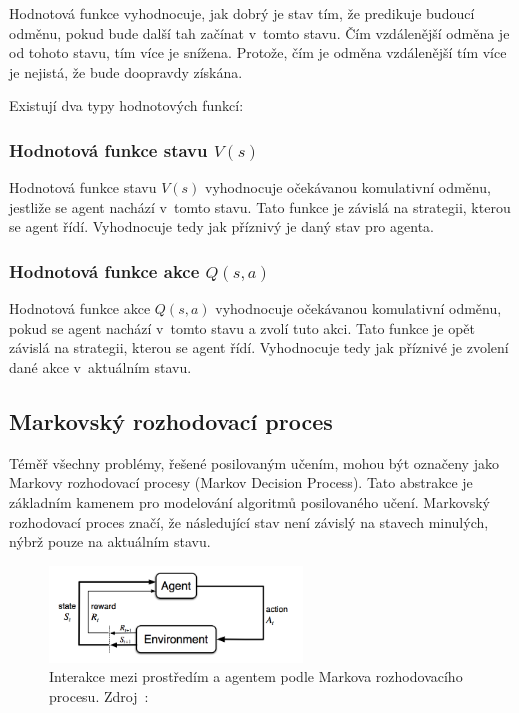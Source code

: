   Hodnotová funkce vyhodnocuje, jak dobrý je stav tím, že predikuje budoucí odměnu, pokud bude další tah začínat v~tomto stavu.
  Čím vzdálenější odměna je od tohoto stavu, tím více je snížena.
  Protože, čím je odměna vzdálenější tím více je nejistá, že bude doopravdy získána.

  Existují dva typy hodnotových funkcí:

  \subsubsection*{Hodnotová funkce stavu $V(s)$}

  Hodnotová funkce stavu \emph{$V(s)$} vyhodnocuje očekávanou komulativní odměnu, jestliže se agent nachází v~tomto stavu.
  Tato funkce je závislá na strategii, kterou se agent řídí.
  Vyhodnocuje tedy jak příznivý je daný stav pro agenta.

  \subsubsection*{Hodnotová funkce akce $Q(s, a)$}
  \label{subsubsec:q_function}

  Hodnotová funkce akce \emph{$Q(s, a)$} vyhodnocuje očekávanou komulativní odměnu, pokud se agent nachází v~tomto stavu a zvolí tuto akci.
  Tato funkce je opět závislá na strategii, kterou se agent řídí.
  Vyhodnocuje tedy jak příznivé je zvolení dané akce v~aktuálním stavu.

\subsection{Markovský rozhodovací proces}\label{subsec:markovsky-rozhodovaci-proces}

Téměř všechny problémy, řešené posilovaným učením, mohou být označeny jako Markovy rozhodovací procesy (Markov Decision Process).
Tato abstrakce je základním kamenem pro modelování algoritmů posilovaného učení.
Markovský rozhodovací proces značí, že následující stav není závislý na stavech minulých, nýbrž pouze na aktuálním stavu.

\begin{figure}[H]
	\centering
	\includegraphics[width=0.6\textwidth]{obrazky-figures/RL_basics}
	\caption{Interakce mezi prostředím a agentem podle Markova rozhodovacího procesu.
  Zdroj~\cite{RL_basics}:}\label{fig:markov}
\end{figure}

